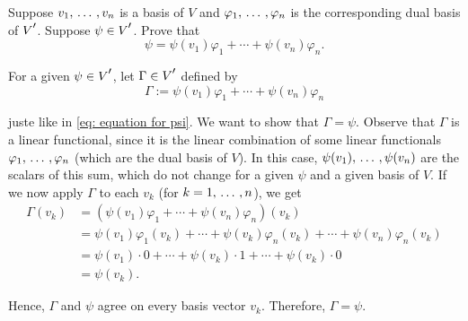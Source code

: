\begin{xrcs}
  Suppose $v_1, {\, \ldots \,\,}, v_n$ is a basis of $V$ and $\varphi_1, {\, \ldots \,\,}, \varphi_n$ is the corresponding dual basis of $\dual{V}$. Suppose $\psi \in \dual{V}$. Prove that
  \begin{equation}
     \label{eq: equation for psi}
     \psi = \psi(v_1) \varphi_1 + \cdots +  \psi(v_n) \varphi_n.
  \end{equation}
  \begin{xsol}
    For a given $\psi \in \dual{V}$, let $\Gamma \in \dual{V}$ defined by
    \begin{equation}
      \Gamma := \psi(v_1) \varphi_1 + \cdots +  \psi(v_n) \varphi_n
    \end{equation}

    juste like in \eqref{eq: equation for psi}. We want to show that $\Gamma = \psi$. Observe that $\Gamma$ is a linear functional, since it is the linear combination of some linear  functionals $\varphi_1, {\, \ldots \,\,}, \varphi_n$ (which are the dual basis of $V$). In this case, $\psi(v_1), {\, \ldots \,\,}, \psi(v_n)$ are the scalars of this sum, which do not change for a given $\psi$ and a given basis of $V$. If we now apply $\Gamma$ to each $v_k$ (for $k = 1, {\, \ldots \,\,}, n$), we get
    \begin{equation}
      \begin{aligned}
        \Gamma(v_k) &= (\psi(v_1) \varphi_1 + \cdots +  \psi(v_n) \varphi_n) (v_k) \\
         &= \psi(v_1) \varphi_1 (v_k) + \cdots +  \psi(v_k) \varphi_n (v_k) + \cdots +  \psi(v_n) \varphi_n (v_k) \\
         &= \psi(v_1) \cdot 0 + \cdots +  \psi(v_k) \cdot 1 + \cdots +  \psi(v_k) \cdot 0 \\
         &= \psi(v_k).
      \end{aligned}
    \end{equation}

    Hence, $\Gamma$ and $\psi$ agree on every basis vector $v_k$. Therefore, $\Gamma = \psi$.
  \end{xsol}
\end{xrcs}

